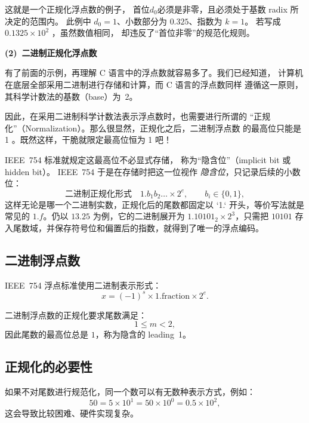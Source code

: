 这就是一个正规化浮点数的例子，
首位$d_0$必须是非零，且必须处于基数 radix 所决定的范围内。
此例中 $d_0 = 1$、小数部分为 $0.325$、指数为 $k = 1$。
若写成 $0.1325 \times 10^2$ ，虽然数值相同，
却违反了“首位非零”的规范化规则。

\vspace{1em}
\noindent\textbf{(2)~二进制正规化浮点数}\par\vspace{0.5em}

有了前面的示例，再理解 C 语言中的浮点数就容易多了。我们已经知道，
计算机在底层全部采用二进制进行存储和计算，而 C 语言的浮点数同样
遵循这一原则，其科学计数法的基数（base）为~2。

因此，在采用二进制科学计数法表示浮点数时，也需要进行所谓的
“正规化”（Normalization）。那么很显然，正规化之后，二进制浮点数
的最高位只能是 1 。既然这样，干脆就限定最高位恒为 1 吧！

IEEE~754 标准就规定这最高位不必显式存储，
称为“隐含位”（implicit bit 或 hidden bit）。
IEEE~754 于是在存储时把这一位视作 \emph{隐含位}，只记录后续的小数位：
\[
\text{二进制正规化形式}\quad 1.b_1b_2\ldots \times 2^e,\qquad b_i \in \{0,1\},
\]
这样无论是哪一个二进制实数，正规化后的尾数都固定以 `1.` 开头，等价写法就是常见的 $1.f$。仍以 $13.25$ 为例，它的二进制展开为 $1.10101_2 \times 2^3$，只需把 $10101$ 存入尾数域，并保存符号位和偏置后的指数，就得到了唯一的浮点编码。














\subsection{二进制浮点数}

IEEE~754 浮点标准使用二进制表示形式：
\[
x = (-1)^s \times 1.\text{fraction} \times 2^{e}.
\]

二进制浮点数的正规化要求尾数满足：
\[
1 \le m < 2,
\]
因此尾数的最高位总是 $1$，称为隐含的 leading\ 1。

\subsection{正规化的必要性}

如果不对尾数进行规范化，同一个数可以有无数种表示方式，例如：
\[
50 = 5 \times 10^{1} = 50 \times 10^{0} = 0.5 \times 10^{2},
\]
这会导致比较困难、硬件实现复杂。

